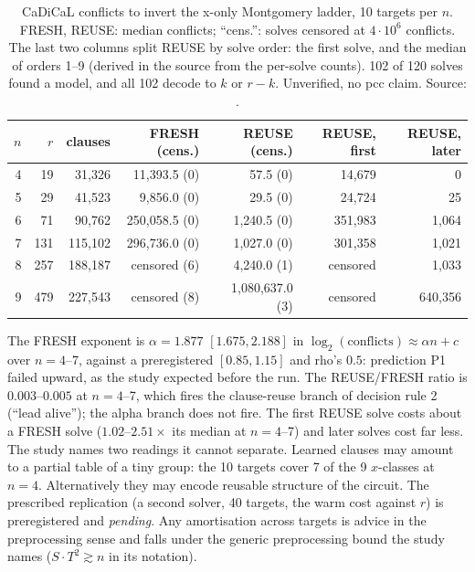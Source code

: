 \begin{table}[t]
\centering\small
\begin{tabular}{@{}rrrrrrr@{}}
\toprule
$n$ & $r$ & clauses & FRESH (cens.) & REUSE (cens.) & REUSE, first & REUSE, later \\
\midrule
4 & 19 & 31{,}326 & 11{,}393.5 (0) & 57.5 (0) & 14{,}679 & 0 \\
5 & 29 & 41{,}523 & 9{,}856.0 (0) & 29.5 (0) & 24{,}724 & 25 \\
6 & 71 & 90{,}762 & 250{,}058.5 (0) & 1{,}240.5 (0) & 351{,}983 & 1{,}064 \\
7 & 131 & 115{,}102 & 296{,}736.0 (0) & 1{,}027.0 (0) & 301{,}358 & 1{,}021 \\
8 & 257 & 188{,}187 & censored (6) & 4{,}240.0 (1) & censored & 1{,}033 \\
9 & 479 & 227{,}543 & censored (8) & 1{,}080{,}637.0 (3) & censored & 640{,}356 \\
\bottomrule
\end{tabular}
\caption[]{CaDiCaL conflicts to invert the x-only Montgomery ladder, 10
targets per $n$. FRESH, REUSE: median conflicts; ``cens.'': solves
censored at $4\cdot10^6$ conflicts. The last two columns split REUSE by
solve order: the first solve, and the median of orders 1--9 (derived in the
source from the per-solve counts). 102 of 120 solves found
a model, and all 102 decode to $k$ or $r-k$. Unverified, no pcc claim.
Source: .}
\label{tab:bo-satladder}
\end{table}

The FRESH exponent is $\alpha=1.877$ $[1.675,2.188]$ in
$\log_2(\text{conflicts})\approx\alpha n+c$ over $n=4$--7, against a
preregistered $[0.85,1.15]$ and rho's $0.5$: prediction P1 failed upward, as
the study expected before the run. The REUSE/FRESH ratio is $0.003$--$0.005$
at $n=4$--7, which fires the clause-reuse branch of decision rule 2 (``lead
alive''); the alpha branch does not fire. The first REUSE solve costs about
a FRESH solve ($1.02$--$2.51\times$ its median at $n=4$--7) and later solves
cost far less. The study names two readings it cannot separate. Learned
clauses may amount to a partial table of a tiny group: the 10 targets cover
7 of the 9 $x$-classes at $n=4$. Alternatively they may encode reusable
structure of the circuit. The prescribed replication (a second solver,
40 targets, the warm cost against $r$) is preregistered and
\emph{pending}. Any amortisation across targets is advice in the
preprocessing sense and falls under the generic preprocessing bound the
study names ($S\cdot T^2\gtrsim n$ in its notation).

